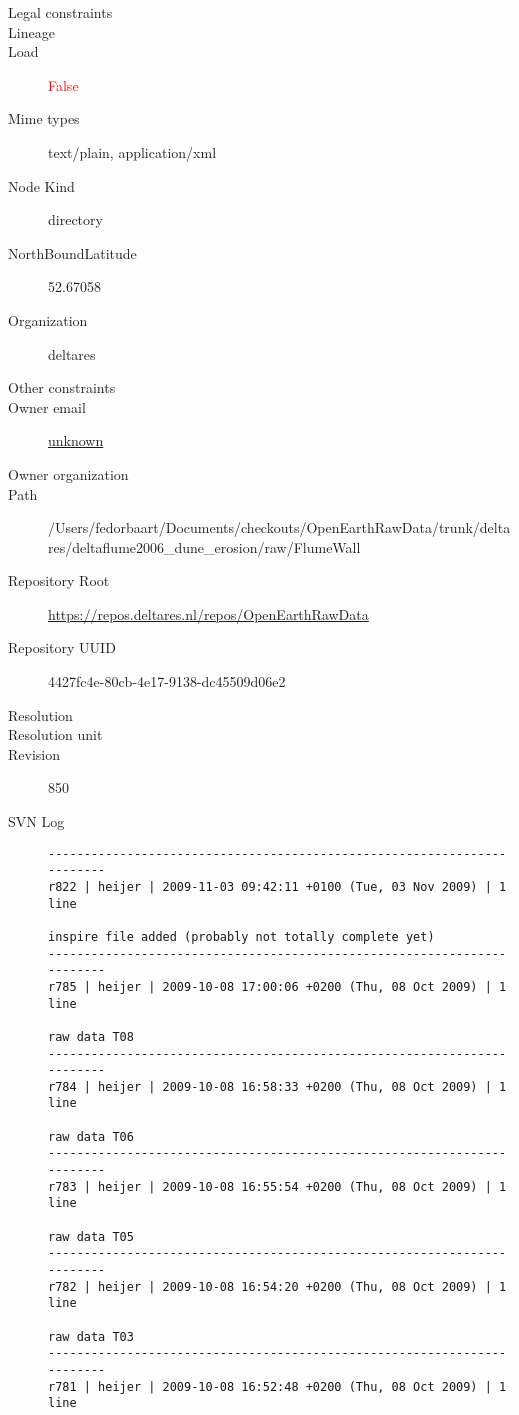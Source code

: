 \documentclass[9]{report}
\begin{document}
\begin{description}
  \item[Legal constraints] 
  \item[Lineage] 
  \item[Load] \textcolor{red}{False}
  \item[Mime types] text/plain, application/xml
  \item[Node Kind] directory
  \item[NorthBoundLatitude] 52.67058
  \item[Organization] deltares
  \item[Other constraints] 
  \item[Owner email] \href{mailto:unknown}{unknown}
  \item[Owner organization] 
  \item[Path] /Users/fedorbaart/Documents/checkouts/OpenEarthRawData/trunk/deltares/deltaflume2006\_dune\_erosion/raw/FlumeWall
  \item[Repository Root] \href{https://repos.deltares.nl/repos/OpenEarthRawData}{https://repos.deltares.nl/repos/OpenEarthRawData}
  \item[Repository UUID] 4427fc4e-80cb-4e17-9138-dc45509d06e2
  \item[Resolution] 
  \item[Resolution unit] 
  \item[Revision] 850
  \item[SVN Log] \begin{verbatim}
------------------------------------------------------------------------
r822 | heijer | 2009-11-03 09:42:11 +0100 (Tue, 03 Nov 2009) | 1 line

inspire file added (probably not totally complete yet)
------------------------------------------------------------------------
r785 | heijer | 2009-10-08 17:00:06 +0200 (Thu, 08 Oct 2009) | 1 line

raw data T08
------------------------------------------------------------------------
r784 | heijer | 2009-10-08 16:58:33 +0200 (Thu, 08 Oct 2009) | 1 line

raw data T06
------------------------------------------------------------------------
r783 | heijer | 2009-10-08 16:55:54 +0200 (Thu, 08 Oct 2009) | 1 line

raw data T05
------------------------------------------------------------------------
r782 | heijer | 2009-10-08 16:54:20 +0200 (Thu, 08 Oct 2009) | 1 line

raw data T03
------------------------------------------------------------------------
r781 | heijer | 2009-10-08 16:52:48 +0200 (Thu, 08 Oct 2009) | 1 line


\end{verbatim}
\end{description}
\end{document}
